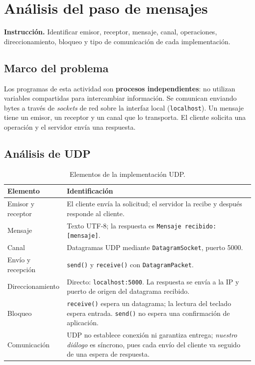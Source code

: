 \documentclass[12pt,oneside]{book}
\begin{document}
\frontmatter
\tableofcontents
\listoffigures
\listoftables
\mainmatter

\chapter{Análisis del paso de mensajes}
\textbf{Instrucción.} Identificar emisor, receptor, mensaje, canal, operaciones, direccionamiento, bloqueo y tipo de comunicación de cada implementación.

\section{Marco del problema}
Los programas de esta actividad son \textbf{procesos independientes}: no utilizan variables compartidas para intercambiar información. Se comunican enviando bytes a través de \textit{sockets} de red sobre la interfaz local (\texttt{localhost}). Un mensaje tiene un emisor, un receptor y un canal que lo transporta. El cliente solicita una operación y el servidor envía una respuesta.

\section{Análisis de UDP}
\begin{table}[H]\centering\small
\caption{Elementos de la implementación UDP.}
\begin{tabularx}{\textwidth}{P{3.4cm} L}
\toprule
\textbf{Elemento} & \textbf{Identificación}\\\midrule
Emisor y receptor & El cliente envía la solicitud; el servidor la recibe y después responde al cliente.\\
Mensaje & Texto UTF-8; la respuesta es \texttt{Mensaje recibido: [mensaje]}.\\
Canal & Datagramas UDP mediante \texttt{DatagramSocket}, puerto 5000.\\
Envío y recepción & \texttt{send()} y \texttt{receive()} con \texttt{DatagramPacket}.\\
Direccionamiento & Directo: \texttt{localhost:5000}. La respuesta se envía a la IP y puerto de origen del datagrama recibido.\\
Bloqueo & \texttt{receive()} espera un datagrama; la lectura del teclado espera entrada. \texttt{send()} no espera una confirmación de aplicación.\\
Comunicación & UDP no establece conexión ni garantiza entrega; \textit{nuestro diálogo} es síncrono, pues cada envío del cliente va seguido de una espera de respuesta.\\
\bottomrule
\end{tabularx}
\end{table}
\end{document}
